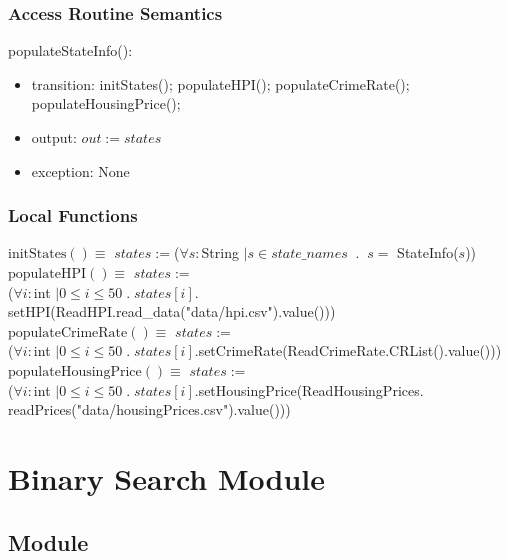 \documentclass[12pt]{article}
\begin{document}
\subsubsection* {Access Routine Semantics}

\noindent populateStateInfo():
\begin{itemize}
\item transition: initStates(); populateHPI(); populateCrimeRate(); \\populateHousingPrice();
\item output: $\mathit{out} := states$
\item exception: None
\end{itemize}

\subsubsection* {Local Functions}

\noindent
$\text{initStates}() \equiv$ $states := $($\forall s: $String $| s \in state\_names \;\;.\;\; s = $ StateInfo($s$))\\

\noindent
$\text{populateHPI}() \equiv$ $states := $\\($\forall i: $int $| 0 \le i \le 50 \;.\; states[i].$setHPI(ReadHPI.read\_data("data/hpi.csv").value()))\\

\noindent
$\text{populateCrimeRate}() \equiv$ $states := $\\($\forall i: $int $| 0 \le i \le 50 \;.\; states[i].$setCrimeRate(ReadCrimeRate.CRList().value()))\\

\noindent
$\text{populateHousingPrice}() \equiv$ $states := $\\($\forall i: $int $| 0 \le i \le 50 \;.\; states[i].$setHousingPrice(ReadHousingPrices.\\readPrices("data/housingPrices.csv").value()))



\newpage

\section* {Binary Search Module}

\subsection* {Module}
\end{document}

